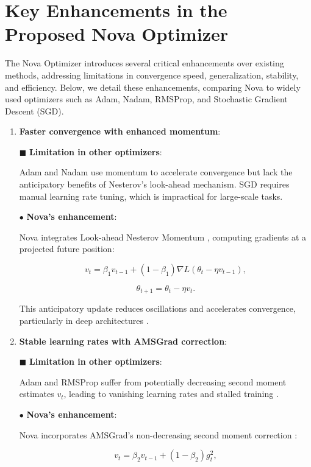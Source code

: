 \documentclass{article}
\begin{document}
\section{Key Enhancements in the Proposed Nova Optimizer}\label{Sec 6}

The Nova Optimizer introduces several critical enhancements over existing methods, addressing limitations in convergence speed, generalization, stability, and efficiency. Below, we detail these enhancements, comparing Nova to widely used optimizers such as Adam, Nadam, RMSProp, and Stochastic Gradient Descent (SGD).

\begin{enumerate}


\item  {\bf  Faster convergence with enhanced momentum}:

$\blacksquare$ \textbf{Limitation in other optimizers}:

Adam \cite{kingma2014adam} and Nadam \cite{Dozat2016} use momentum to accelerate convergence but lack the anticipatory benefits of Nesterov’s look-ahead mechanism. SGD requires manual learning rate tuning, which is impractical for large-scale tasks.

$\bullet$ \textbf{Nova’s enhancement}:

Nova integrates Look-ahead Nesterov Momentum \cite{nesterov1983method}, computing gradients at a projected future position:


\[
v_t = \beta_1 v_{t-1} + (1 - \beta_1) \nabla L(\theta_t - \eta v_{t-1}),
\]




\[
\theta_{t+1} = \theta_t - \eta v_t.
\]


This anticipatory update reduces oscillations and accelerates convergence, particularly in deep architectures \cite{Sutskever2013}.

\item{\bf Stable learning rates with AMSGrad correction}:

$\blacksquare$ \textbf{Limitation in other optimizers}:

Adam and RMSProp \cite{Tieleman2012} suffer from potentially decreasing second moment estimates $v_t$, leading to vanishing learning rates and stalled training \cite{Reddi2018}.

$\bullet$ \textbf{Nova’s enhancement}:

Nova incorporates AMSGrad’s non-decreasing second moment correction \cite{Reddi2018}:


\[
v_t = \beta_2 v_{t-1} + (1 - \beta_2) g_t^2,
\]





\end{enumerate}
\end{document}
